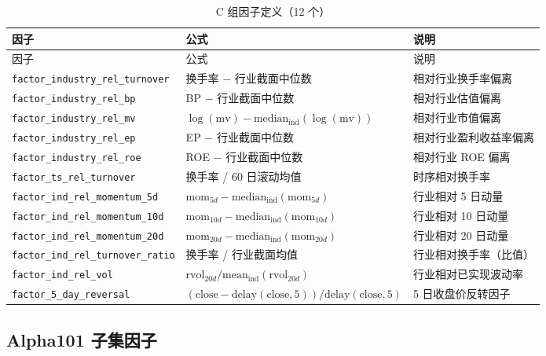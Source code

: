 \documentclass[12pt, a4paper, oneside]{article}
\begin{document}
\begin{longtable}{L{0.37\textwidth} L{0.30\textwidth} L{0.27\textwidth}}
\caption{C 组因子定义（12 个）}\label{tab:appendix-c}\\
\toprule
因子 & 公式 & 说明 \\
\midrule
\endfirsthead
\toprule
因子 & 公式 & 说明 \\
\midrule
\endhead
\bottomrule
\endfoot
\texttt{factor\_industry\_rel\_turnover} & 换手率 \(-\) 行业截面中位数 & 相对行业换手率偏离 \\
\texttt{factor\_industry\_rel\_bp} & BP \(-\) 行业截面中位数 & 相对行业估值偏离 \\
\texttt{factor\_industry\_rel\_mv} & $\log(\mathrm{mv}) - \mathrm{median}_{\mathrm{ind}}(\log(\mathrm{mv}))$ & 相对行业市值偏离 \\
\texttt{factor\_industry\_rel\_ep} & EP \(-\) 行业截面中位数 & 相对行业盈利收益率偏离 \\
\texttt{factor\_industry\_rel\_roe} & ROE \(-\) 行业截面中位数 & 相对行业 ROE 偏离 \\
\texttt{factor\_ts\_rel\_turnover} & 换手率 / 60 日滚动均值 & 时序相对换手率 \\
\texttt{factor\_ind\_rel\_momentum\_5d} & $\mathrm{mom}_{5d} - \mathrm{median}_{\mathrm{ind}}(\mathrm{mom}_{5d})$ & 行业相对 5 日动量 \\
\texttt{factor\_ind\_rel\_momentum\_10d} & $\mathrm{mom}_{10d} - \mathrm{median}_{\mathrm{ind}}(\mathrm{mom}_{10d})$ & 行业相对 10 日动量 \\
\texttt{factor\_ind\_rel\_momentum\_20d} & $\mathrm{mom}_{20d} - \mathrm{median}_{\mathrm{ind}}(\mathrm{mom}_{20d})$ & 行业相对 20 日动量 \\
\texttt{factor\_ind\_rel\_turnover\_ratio} & 换手率 / 行业截面均值 & 行业相对换手率（比值） \\
\texttt{factor\_ind\_rel\_vol} & $\mathrm{rvol}_{20d}/\mathrm{mean}_{\mathrm{ind}}(\mathrm{rvol}_{20d})$ & 行业相对已实现波动率 \\
\texttt{factor\_5\_day\_reversal} & $(\mathrm{close}-\mathrm{delay}(\mathrm{close},5))/\mathrm{delay}(\mathrm{close},5)$ & 5 日收盘价反转因子 \\
\end{longtable}

\subsection{Alpha101 子集因子}
\end{document}
